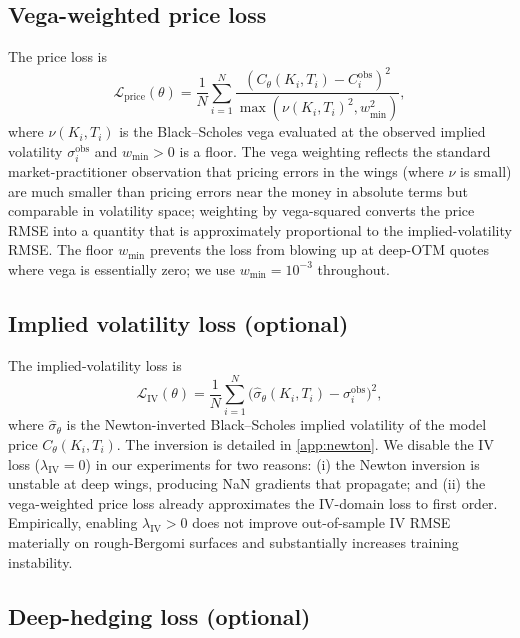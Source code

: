 \documentclass[largeformat]{interact}
\theoremstyle{plain}
\theoremstyle{definition}
\newcommand{\bs}{Black--Scholes}
\begin{document}
\subsection{Vega-weighted price loss}
\label{sec:vega-weighting}

The price loss is
\begin{equation}
\label{eq:price-loss}
\mathcal{L}_{\mathrm{price}}(\theta) = \frac{1}{N}\sum_{i=1}^N \frac{(C_\theta(K_i, T_i) - C^{\mathrm{obs}}_i)^2}{\max(\nu(K_i, T_i)^2, w_{\min}^2)},
\end{equation}
where $\nu(K_i, T_i)$ is the \bs{} vega evaluated at the observed implied volatility $\sigma^{\mathrm{obs}}_i$ and $w_{\min} > 0$ is a floor. The vega weighting reflects the standard market-practitioner observation that pricing errors in the wings (where $\nu$ is small) are much smaller than pricing errors near the money in absolute terms but comparable in volatility space; weighting by vega-squared converts the price RMSE into a quantity that is approximately proportional to the implied-volatility RMSE. The floor $w_{\min}$ prevents the loss from blowing up at deep-OTM quotes where vega is essentially zero; we use $w_{\min} = 10^{-3}$ throughout.

\subsection{Implied volatility loss (optional)}
\label{sec:iv-loss}

The implied-volatility loss is
\begin{equation}
\label{eq:iv-loss}
\mathcal{L}_{\mathrm{IV}}(\theta) = \frac{1}{N}\sum_{i=1}^N \bigl(\widehat\sigma_\theta(K_i, T_i) - \sigma^{\mathrm{obs}}_i\bigr)^2,
\end{equation}
where $\widehat\sigma_\theta$ is the Newton-inverted \bs{} implied volatility of the model price $C_\theta(K_i, T_i)$. The inversion is detailed in \cref{app:newton}. We disable the IV loss ($\lambda_{\mathrm{IV}} = 0$) in our experiments for two reasons: (i) the Newton inversion is unstable at deep wings, producing NaN gradients that propagate; and (ii) the vega-weighted price loss already approximates the IV-domain loss to first order. Empirically, enabling $\lambda_{\mathrm{IV}} > 0$ does not improve out-of-sample IV RMSE materially on rough-Bergomi surfaces and substantially increases training instability.

\subsection{Deep-hedging loss (optional)}
\label{sec:hedge-loss}
\end{document}
